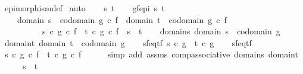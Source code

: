 \begin{isabellebody}
\ epimorphism{\isacharunderscore}{\kern0pt}def\isanewline
{}\isamarkupfalse%
\ auto\isanewline
\ \ \isamarkupfalse%
\ s\ t\isanewline
\ \ \isamarkupfalse%
\ gf{\isacharunderscore}{\kern0pt}epi{\isacharcolon}{\kern0pt}\ {\isachardoublequoteopen}{\isasymforall}s{\isachardot}{\kern0pt}\ {\isasymforall}t{\isachardot}{\kern0pt}\isanewline
\ \ \ \ domain\ s\ {\isacharequal}{\kern0pt}\ codomain\ {\isacharparenleft}{\kern0pt}g\ {\isasymcirc}\isactrlsub c\ f{\isacharparenright}{\kern0pt}\ {\isasymand}\ domain\ t\ {\isacharequal}{\kern0pt}\ codomain\ {\isacharparenleft}{\kern0pt}g\ {\isasymcirc}\isactrlsub c\ f{\isacharparenright}{\kern0pt}\ {\isasymlongrightarrow}\isanewline
\ \ \ \ \ \ \ \ \ \ s\ {\isasymcirc}\isactrlsub c\ g\ {\isasymcirc}\isactrlsub c\ f\ {\isacharequal}{\kern0pt}\ t\ {\isasymcirc}\isactrlsub c\ g\ {\isasymcirc}\isactrlsub c\ f\ {\isasymlongrightarrow}\ s\ {\isacharequal}{\kern0pt}\ t{\isachardoublequoteclose}\isanewline
\ \ \isamarkupfalse%
\ domain{\isacharunderscore}{\kern0pt}s{\isacharcolon}{\kern0pt}\ {\isachardoublequoteopen}domain\ s\ {\isacharequal}{\kern0pt}\ codomain\ g{\isachardoublequoteclose}\isanewline
\ \ \isamarkupfalse%
\ domain{\isacharunderscore}{\kern0pt}t{\isacharcolon}{\kern0pt}\ {\isachardoublequoteopen}domain\ t\ {\isacharequal}{\kern0pt}\ codomain\ g{\isachardoublequoteclose}\isanewline
\ \ \isamarkupfalse%
\ sf{\isacharunderscore}{\kern0pt}eq{\isacharunderscore}{\kern0pt}tf{\isacharcolon}{\kern0pt}\ {\isachardoublequoteopen}s\ {\isasymcirc}\isactrlsub c\ g\ {\isacharequal}{\kern0pt}\ t\ {\isasymcirc}\isactrlsub c\ g{\isachardoublequoteclose}\isanewline
\isanewline
\ \ \isamarkupfalse%
\ sf{\isacharunderscore}{\kern0pt}eq{\isacharunderscore}{\kern0pt}tf\ \isamarkupfalse%
\ {\isachardoublequoteopen}s\ {\isasymcirc}\isactrlsub c\ {\isacharparenleft}{\kern0pt}g\ {\isasymcirc}\isactrlsub c\ f{\isacharparenright}{\kern0pt}\ {\isacharequal}{\kern0pt}\ t\ {\isasymcirc}\isactrlsub c\ {\isacharparenleft}{\kern0pt}g\ {\isasymcirc}\isactrlsub c\ f{\isacharparenright}{\kern0pt}{\isachardoublequoteclose}\isanewline
\ \ \ \ \isamarkupfalse%
\ {\isacharparenleft}{\kern0pt}simp\ add{\isacharcolon}{\kern0pt}\ assms\ comp{\isacharunderscore}{\kern0pt}associative\ domain{\isacharunderscore}{\kern0pt}s\ domain{\isacharunderscore}{\kern0pt}t{\isacharparenright}{\kern0pt}\isanewline
\ \ \isamarkupfalse%
\ \isamarkupfalse%
\ {\isachardoublequoteopen}s\ {\isacharequal}{\kern0pt}\ t{\isachardoublequoteclose}\isanewline

\end{isabellebody}
